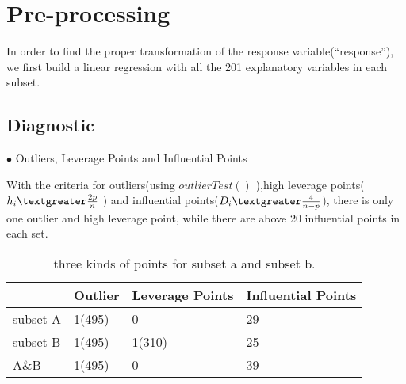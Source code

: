 \documentclass[conference,letterpaper]{IEEEtran}
\begin{document}
%





\section{\large Pre-processing}

{\fontsize{11}{13}\selectfont In order to find the proper transformation of the response variable(``response''), we first build a linear regression with all the 201 explanatory variables in each subset. }
\subsection{{\fontsize{11}{13}\selectfont Diagnostic}}

$\bullet$ {\fontsize{11}{13}\selectfont Outliers, Leverage Points and Influential Points}
 
 {\fontsize{11}{13}\selectfont 
 
With the criteria for outliers(using $outlierTest()$ ),high leverage points($h_i\textgreater \frac{2p}{n}$ ) and influential points($D_i\textgreater \frac{4}{n-p}$), there is only one outlier and high leverage point, while there are above 20 influential points in each set.}
  
 \begin{table}
	\centering
	\caption{\lowercase{\normalsize  Three kinds of points for subset \MakeUppercase{a} and subset \MakeUppercase{b}.}}
	\label{tab:table_1}
	\begin{tabular}{M{1.5cm}M{2cm}M{2cm}M{2cm}}
		\hline
		 & \normalsize Outlier &  \normalsize Leverage Points &  \normalsize Influential Points \\
		\hline
		  \normalsize subset A&  \normalsize 1(495) &  \normalsize 0 & \normalsize 29 \\
		 \normalsize subset B&  \normalsize 1(495) &  \normalsize 1(310) & \normalsize 25 \\
		  \normalsize A\&B&  \normalsize 1(495) &  \normalsize 0 & \normalsize 39 \\
		\hline
	\end{tabular}
\end{table}
\end{document}
